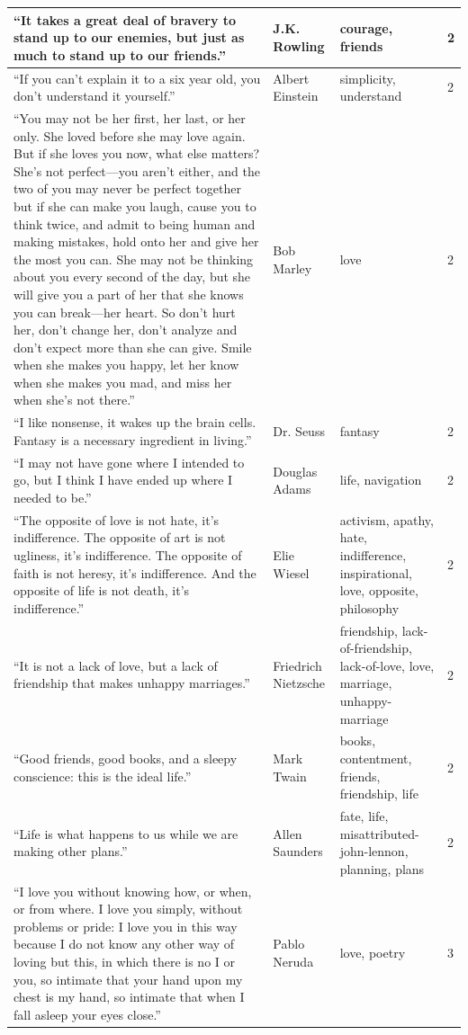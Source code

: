\documentclass[
  letterpaper,
  DIV=11,
  numbers=noendperiod]{scrreprt}
\begin{document}
\begin{tabular}[t]{l|l|l|l}
\hline
“It takes a great deal of bravery to stand up to our enemies, but just as much to stand up to our friends.” & J.K. Rowling & courage, friends & 2\\
\hline
“If you can't explain it to a six year old, you don't understand it yourself.” & Albert Einstein & simplicity, understand & 2\\
\hline
“You may not be her first, her last, or her only. She loved before she may love again. But if she loves you now, what else matters? She's not perfect—you aren't either, and the two of you may never be perfect together but if she can make you laugh, cause you to think twice, and admit to being human and making mistakes, hold onto her and give her the most you can. She may not be thinking about you every second of the day, but she will give you a part of her that she knows you can break—her heart. So don't hurt her, don't change her, don't analyze and don't expect more than she can give. Smile when she makes you happy, let her know when she makes you mad, and miss her when she's not there.” & Bob Marley & love & 2\\
\hline
“I like nonsense, it wakes up the brain cells. Fantasy is a necessary ingredient in living.” & Dr. Seuss & fantasy & 2\\
\hline
“I may not have gone where I intended to go, but I think I have ended up where I needed to be.” & Douglas Adams & life, navigation & 2\\
\hline
“The opposite of love is not hate, it's indifference. The opposite of art is not ugliness, it's indifference. The opposite of faith is not heresy, it's indifference. And the opposite of life is not death, it's indifference.” & Elie Wiesel & activism, apathy, hate, indifference, inspirational, love, opposite, philosophy & 2\\
\hline
“It is not a lack of love, but a lack of friendship that makes unhappy marriages.” & Friedrich Nietzsche & friendship, lack-of-friendship, lack-of-love, love, marriage, unhappy-marriage & 2\\
\hline
“Good friends, good books, and a sleepy conscience: this is the ideal life.” & Mark Twain & books, contentment, friends, friendship, life & 2\\
\hline
“Life is what happens to us while we are making other plans.” & Allen Saunders & fate, life, misattributed-john-lennon, planning, plans & 2\\
\hline
“I love you without knowing how, or when, or from where. I love you simply, without problems or pride: I love you in this way because I do not know any other way of loving but this, in which there is no I or you, so intimate that your hand upon my chest is my hand, so intimate that when I fall asleep your eyes close.” & Pablo Neruda & love, poetry & 3\\

\end{tabular}
\end{document}
